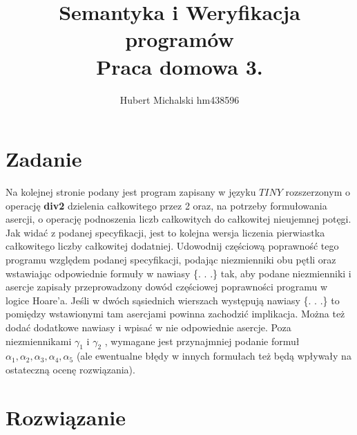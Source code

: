 \documentclass[final,12pt]{article}
\title{\vspace{-1cm}
Semantyka i Weryfikacja programów \\
\large Praca domowa 3.
}
\author{Hubert Michalski hm438596}
\begin{document}
\lstset{language=whileprograms} 

\maketitle
\section{Zadanie}
Na kolejnej stronie podany jest program zapisany w języku $TINY$ rozszerzonym o operację \textbf{div2} dzielenia całkowitego przez 2 oraz, na potrzeby formułowania asercji, o operację podnoszenia liczb całkowitych do całkowitej nieujemnej potęgi. Jak widać z podanej specyfikacji, jest to kolejna wersja liczenia pierwiastka całkowitego liczby całkowitej dodatniej. Udowodnij częściową poprawność tego programu względem podanej specyfikacji, podając niezmienniki obu pętli oraz wstawiając odpowiednie formuły w nawiasy \{. . .\} tak, aby podane niezmienniki i asercje zapisały przeprowadzony dowód częściowej poprawności programu w logice Hoare'a. Jeśli w dwóch sąsiednich wierszach występują nawiasy \{. . .\} to pomiędzy wstawionymi tam asercjami powinna zachodzić implikacja. Można też dodać dodatkowe nawiasy i wpisać w nie odpowiednie asercje. Poza niezmiennikami $\gamma_1$ i $\gamma_2$ , wymagane jest przynajmniej podanie formuł $\alpha_1, \alpha_2, \alpha_3, \alpha_4, \alpha_5$ (ale ewentualne błędy w innych
formułach też będą wpływały na ostateczną ocenę rozwiązania).

\newpage
\section{Rozwiązanie}
\end{document}
